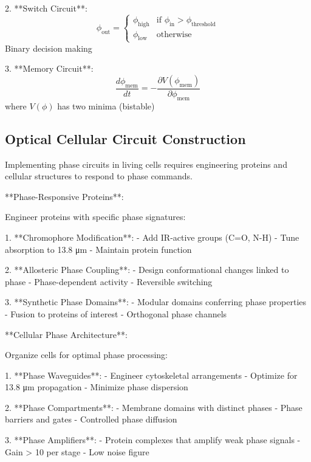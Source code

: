 \documentclass[12pt,a4paper]{report}
\begin{document}
2. **Switch Circuit**:
   \begin{equation}
   \phi_{\text{out}} = \begin{cases}
   \phi_{\text{high}} & \text{if } \phi_{\text{in}} > \phi_{\text{threshold}} \\
   \phi_{\text{low}} & \text{otherwise}
   \end{cases}
   \end{equation}
   Binary decision making

3. **Memory Circuit**:
   \begin{equation}
   \frac{d\phi_{\text{mem}}}{dt} = -\frac{\partial V(\phi_{\text{mem}})}{\partial \phi_{\text{mem}}}
   \end{equation}
   where $V(\phi)$ has two minima (bistable)

\subsection{Optical Cellular Circuit Construction}

Implementing phase circuits in living cells requires engineering proteins and cellular structures to respond to phase commands.

**Phase-Responsive Proteins**:

Engineer proteins with specific phase signatures:

1. **Chromophore Modification**:
   - Add IR-active groups (C=O, N-H)
   - Tune absorption to 13.8 μm
   - Maintain protein function

2. **Allosteric Phase Coupling**:
   - Design conformational changes linked to phase
   - Phase-dependent activity
   - Reversible switching

3. **Synthetic Phase Domains**:
   - Modular domains conferring phase properties
   - Fusion to proteins of interest
   - Orthogonal phase channels

**Cellular Phase Architecture**:

Organize cells for optimal phase processing:

1. **Phase Waveguides**:
   - Engineer cytoskeletal arrangements
   - Optimize for 13.8 μm propagation
   - Minimize phase dispersion

2. **Phase Compartments**:
   - Membrane domains with distinct phases
   - Phase barriers and gates
   - Controlled phase diffusion

3. **Phase Amplifiers**:
   - Protein complexes that amplify weak phase signals
   - Gain > 10 per stage
   - Low noise figure
\end{document}
